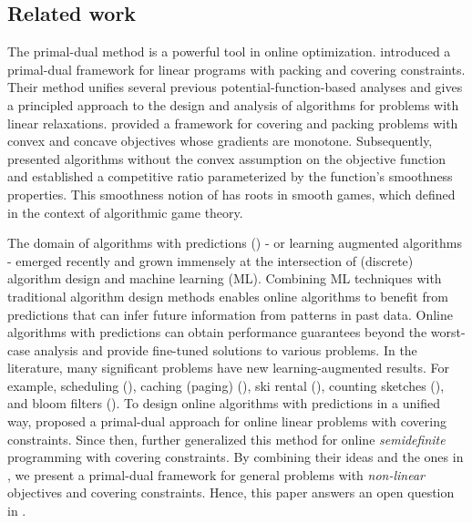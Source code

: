 \subsection{Related work}
The primal-dual method is a powerful tool in online optimization. \cite{BuchbinderNaor09:The-Design-of-Competitive} introduced a primal-dual framework for linear programs with packing and covering constraints. Their method unifies several previous potential-function-based analyses and gives a principled approach to the design and analysis of algorithms for problems with linear relaxations. \cite{AzarBuchbinder16:Online-Algorithms} provided a framework for covering and packing problems with convex and concave objectives whose gradients are monotone. Subsequently, \cite{Thang20:Online-Primal-Dual} presented algorithms without the convex assumption on the objective function and established a competitive ratio parameterized by the function's smoothness properties. This smoothness notion of \cite{Thang20:Online-Primal-Dual} has roots in smooth games, which \cite{Roughgarden15:Intrinsic-Robustness} defined in the context of algorithmic game theory.

The domain of algorithms with predictions (\cite{MitzenmacherVassilvitskii20:Beyond-the-Worst-Case}) - or learning augmented algorithms - emerged recently and grown immensely at the intersection of (discrete) algorithm design and machine learning (ML).
Combining ML techniques with traditional algorithm design methods enables online algorithms to benefit from predictions that can infer future information from patterns in past data. Online algorithms with predictions can obtain performance guarantees beyond the worst-case analysis and provide fine-tuned solutions to various problems. In the literature, many significant problems have new learning-augmented results. For example, scheduling (\cite{LattanziLavastida20:Online-scheduling,Mitzenmacher20:Scheduling-with}), caching (paging) (\cite{LykourisVassilvtiskii18:Competitive-caching,Rohatgi20:Near-optimal-bounds,AntoniadisCoester20:Online-metric}), ski rental (\cite{GollapudiPanigrahi19:Online-algorithms,KumarPurohit18:Improving-online}), counting sketches (\cite{HsuIndyk19:Learning-Based-Frequency}), and bloom filters (\cite{KraskaBeutel18:The-case-for-learned,Mitzenmacher18:A-model-for-learned}).
To design online algorithms with predictions in a unified way, \cite{BamasMaggiori20:The-Primal-Dual-method} proposed a primal-dual approach for online linear problems with covering constraints. Since then, \cite{GrigorescuLin22:Learning-Augmented-Algorithms} further generalized this method for online \emph{semidefinite} programming with covering constraints. By combining their ideas and the ones in \cite{BuchbinderNaor09:The-Design-of-Competitive,AzarBuchbinder16:Online-Algorithms,Thang20:Online-Primal-Dual}, we present a primal-dual framework for general problems with \emph{non-linear} objectives and covering constraints. Hence, this paper answers an open question in \cite{BamasMaggiori20:The-Primal-Dual-method}.


